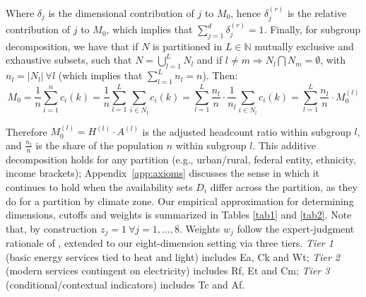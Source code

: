 \documentclass[11pt, a4paper]{article}
\begin{document}
Where $\delta_j$ is the dimensional contribution of $j$ to $M_0$, hence $\delta_j^{(r)}$ is the relative contribution of $j$ to $M_0$, which implies that $\sum_{j=1}^d \delta^{(r)}_j=1$. Finally, for subgroup decomposition, we have that if $N$ is partitioned in $L \in \mathbb{N}$ mutually exclusive and exhaustive subsets, such that $N=\bigcup_{l=1}^L N_l$ and if $l\neq m \Rightarrow N_l\bigcap N_m=\emptyset$, with $n_l=|N_l| \ \forall l$ (which implies that $\sum_{l=1}^Ln_l=n$). Then: \begin{equation}
    M_0=\frac{1}{n}\sum_{i=1}^nc_i(k)=\frac{1}{n}\sum_{l=1}^L\sum_{i \in N_l}c_i(k)=\sum_{l=1}^L\frac{n_l}{n}\cdot \frac{1}{n_l}\sum_{i \in N_l}c_i(k)=\sum_{l=1}^L\frac{n_l}{n}\cdot M_0^{(l)}
    \label{eq:decomp}
\end{equation}

Therefore $M_0^{(l)}=H^{(l)}\cdot A^{(l)}$ is the adjusted headcount ratio within subgroup $l$, and $\frac{n_l}{n}$ is the share of the population $n$ within subgroup $l$. This additive decomposition holds for any partition (e.g., urban/rural, federal entity, ethnicity, income brackets); Appendix~\ref{app:axioms} discusses the sense in which it continues to hold when the availability sets $D_i$ differ across the partition, as they do for a partition by climate zone. Our empirical approximation for determining dimensions, cutoffs and weights is summarized in Tables \ref{tab1} and \ref{tab2}. Note that, by construction $z_j=1 \ \forall j=1,...,8$.  Weights $w_j$ follow the expert-judgment rationale of \textcite{nussbaumer2012}, extended to our eight-dimension setting via three tiers. \emph{Tier 1} (basic energy services tied to heat and light) includes Ea, Ck and Wt; \emph{Tier 2} (modern services contingent on electricity) includes Rf, Et and Cm; \emph{Tier 3} (conditional/contextual indicators) includes Tc and Af.
\end{document}
